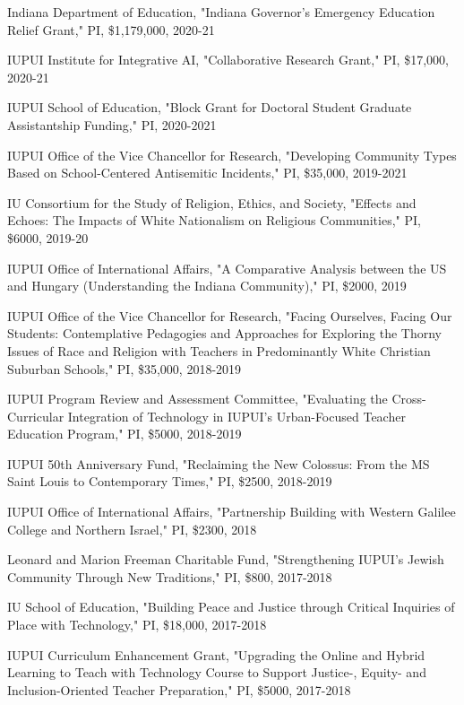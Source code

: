 \documentclass[11pt,article,oneside]{memoir}
\begin{document}
\bigskip

\medskip

\ind Indiana Department of Education, "Indiana Governor's Emergency Education Relief Grant," PI, \$1,179,000, 2020-21

\ind IUPUI Institute for Integrative AI, "Collaborative Research Grant," PI, \$17,000, 2020-21

\ind IUPUI School of Education, "Block Grant for Doctoral Student Graduate Assistantship Funding," PI, 2020-2021

\ind IUPUI Office of the Vice Chancellor for Research, "Developing Community Types Based on School-Centered Antisemitic Incidents," PI, \$35,000, 2019-2021

\ind IU Consortium for the Study of Religion, Ethics, and Society, "Effects and Echoes: The Impacts of White Nationalism on Religious Communities," PI, \$6000, 2019-20

\ind IUPUI Office of International Affairs, "A Comparative Analysis between the US and Hungary (Understanding the Indiana Community)," PI, \$2000, 2019

\ind IUPUI Office of the Vice Chancellor for Research, "Facing Ourselves, Facing Our Students: Contemplative Pedagogies and Approaches for Exploring the Thorny Issues of Race and Religion with Teachers in Predominantly White Christian Suburban Schools," PI, \$35,000, 2018-2019

\ind IUPUI Program Review and Assessment Committee, "Evaluating the Cross-Curricular Integration of Technology in IUPUI’s Urban-Focused Teacher Education Program," PI, \$5000, 2018-2019

\ind IUPUI 50th Anniversary Fund, "Reclaiming the New Colossus: From the MS Saint Louis to Contemporary Times,"	PI, \$2500, 2018-2019

\ind IUPUI Office of International Affairs, "Partnership Building with Western Galilee College and Northern Israel," PI, \$2300, 2018

\ind Leonard and Marion Freeman Charitable Fund, "Strengthening IUPUI’s Jewish Community Through New Traditions,"	PI, \$800, 2017-2018

\ind IU School of Education, "Building Peace and Justice through Critical Inquiries of Place with Technology," PI, \$18,000, 2017-2018

\ind IUPUI Curriculum Enhancement Grant, "Upgrading the Online and Hybrid Learning to Teach with Technology Course to Support Justice-, Equity- and Inclusion-Oriented Teacher Preparation," PI, \$5000, 2017-2018
\end{document}
